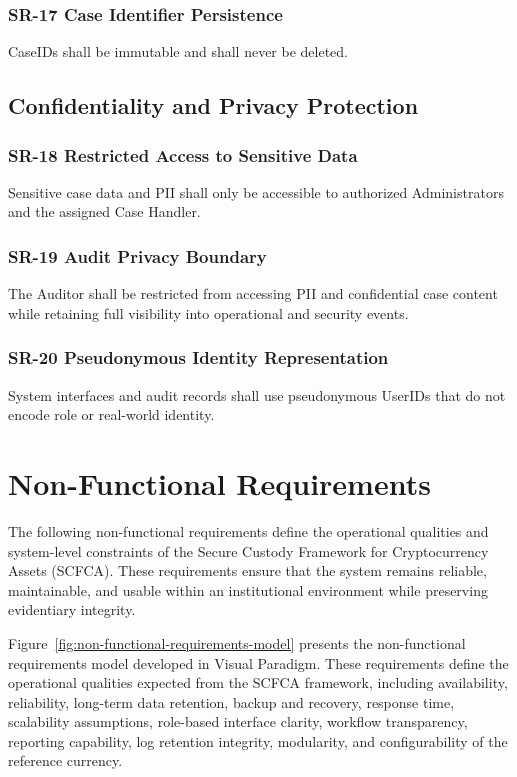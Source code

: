 \documentclass[12pt,a4paper]{report}
\begin{document}
\subsubsection{SR-17 Case Identifier Persistence}

CaseIDs shall be immutable and shall never be deleted.

\subsection{Confidentiality and Privacy Protection}

\subsubsection{SR-18 Restricted Access to Sensitive Data}

Sensitive case data and PII shall only be accessible to authorized Administrators and the assigned Case Handler.

\subsubsection{SR-19 Audit Privacy Boundary}

The Auditor shall be restricted from accessing PII and confidential case content while retaining full visibility into operational and security events.

\subsubsection{SR-20 Pseudonymous Identity Representation}

System interfaces and audit records shall use pseudonymous UserIDs that do not encode role or real-world identity.

\section{Non-Functional Requirements}

The following non-functional requirements define the operational qualities and system-level constraints of the Secure Custody Framework for Cryptocurrency Assets (SCFCA). These requirements ensure that the system remains reliable, maintainable, and usable within an institutional environment while preserving evidentiary integrity.

Figure~\ref{fig:non-functional-requirements-model} presents the non-functional requirements model developed in Visual Paradigm. These requirements define the operational qualities expected from the SCFCA framework, including availability, reliability, long-term data retention, backup and recovery, response time, scalability assumptions, role-based interface clarity, workflow transparency, reporting capability, log retention integrity, modularity, and configurability of the reference currency.
\end{document}
